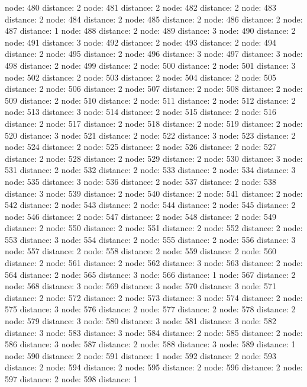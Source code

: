 \documentclass{article}
\begin{document}
node: 480 distance: 2
node: 481 distance: 2
node: 482 distance: 2
node: 483 distance: 2
node: 484 distance: 2
node: 485 distance: 2
node: 486 distance: 2
node: 487 distance: 1
node: 488 distance: 2
node: 489 distance: 3
node: 490 distance: 2
node: 491 distance: 3
node: 492 distance: 2
node: 493 distance: 2
node: 494 distance: 2
node: 495 distance: 2
node: 496 distance: 3
node: 497 distance: 3
node: 498 distance: 2
node: 499 distance: 2
node: 500 distance: 2
node: 501 distance: 3
node: 502 distance: 2
node: 503 distance: 2
node: 504 distance: 2
node: 505 distance: 2
node: 506 distance: 2
node: 507 distance: 2
node: 508 distance: 2
node: 509 distance: 2
node: 510 distance: 2
node: 511 distance: 2
node: 512 distance: 2
node: 513 distance: 3
node: 514 distance: 2
node: 515 distance: 2
node: 516 distance: 2
node: 517 distance: 2
node: 518 distance: 2
node: 519 distance: 2
node: 520 distance: 3
node: 521 distance: 2
node: 522 distance: 3
node: 523 distance: 2
node: 524 distance: 2
node: 525 distance: 2
node: 526 distance: 2
node: 527 distance: 2
node: 528 distance: 2
node: 529 distance: 2
node: 530 distance: 3
node: 531 distance: 2
node: 532 distance: 2
node: 533 distance: 2
node: 534 distance: 3
node: 535 distance: 3
node: 536 distance: 2
node: 537 distance: 2
node: 538 distance: 3
node: 539 distance: 2
node: 540 distance: 2
node: 541 distance: 2
node: 542 distance: 2
node: 543 distance: 2
node: 544 distance: 2
node: 545 distance: 2
node: 546 distance: 2
node: 547 distance: 2
node: 548 distance: 2
node: 549 distance: 2
node: 550 distance: 2
node: 551 distance: 2
node: 552 distance: 2
node: 553 distance: 3
node: 554 distance: 2
node: 555 distance: 2
node: 556 distance: 3
node: 557 distance: 2
node: 558 distance: 2
node: 559 distance: 2
node: 560 distance: 2
node: 561 distance: 2
node: 562 distance: 3
node: 563 distance: 2
node: 564 distance: 2
node: 565 distance: 3
node: 566 distance: 1
node: 567 distance: 2
node: 568 distance: 3
node: 569 distance: 3
node: 570 distance: 3
node: 571 distance: 2
node: 572 distance: 2
node: 573 distance: 3
node: 574 distance: 2
node: 575 distance: 3
node: 576 distance: 2
node: 577 distance: 2
node: 578 distance: 2
node: 579 distance: 3
node: 580 distance: 3
node: 581 distance: 3
node: 582 distance: 3
node: 583 distance: 3
node: 584 distance: 2
node: 585 distance: 2
node: 586 distance: 3
node: 587 distance: 2
node: 588 distance: 3
node: 589 distance: 1
node: 590 distance: 2
node: 591 distance: 1
node: 592 distance: 2
node: 593 distance: 2
node: 594 distance: 2
node: 595 distance: 2
node: 596 distance: 2
node: 597 distance: 2
node: 598 distance: 1
\end{document}
